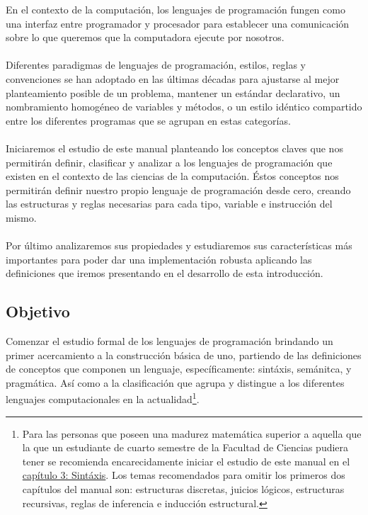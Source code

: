 En el contexto de la computación, los lenguajes de programación fungen como una interfaz entre programador y procesador para establecer una comunicación sobre lo que queremos que la computadora ejecute por nosotros.\\\\
Diferentes paradigmas de lenguajes de programación, estilos, reglas y convenciones se han adoptado en las últimas décadas para ajustarse al mejor planteamiento posible de un problema, mantener un estándar declarativo, un nombramiento homogéneo de variables y métodos, o un estilo idéntico compartido entre los diferentes programas que se agrupan en estas categorías.\\\\
Iniciaremos el estudio de este manual planteando los conceptos claves que nos permitirán definir, clasificar y analizar a los lenguajes de programación que existen en el contexto de las ciencias de la computación. Éstos conceptos nos permitirán definir nuestro propio lenguaje de programación desde cero, creando las estructuras y reglas necesarias para cada tipo, variable e instrucción del mismo.\\\\
Por último analizaremos sus propiedades y estudiaremos sus características más importantes para poder dar una implementación robusta aplicando las definiciones que iremos presentando en el desarrollo de esta introducción.\\

\subsection*{Objetivo}
    Comenzar el estudio formal de los lenguajes de programación brindando un primer acercamiento a la construcción básica de uno, partiendo de las definiciones de conceptos que componen un lenguaje, específicamente: sintáxis, semánitca, y pragmática. Así como a la clasificación que agrupa y distingue a los diferentes lenguajes computacionales en la actualidad\footnote{Para las personas que poseen una madurez matemática superior a aquella que la que un estudiante de cuarto semestre de la Facultad de Ciencias pudiera tener se recomienda encarecidamente iniciar el estudio de este manual en el \hyperref[sec:sintax]{capítulo 3: Sintáxis}. Los temas recomendados para omitir los primeros dos capítulos del manual son: estructuras discretas, juicios lógicos, estructuras recursivas, reglas de inferencia e inducción estructural. }.

